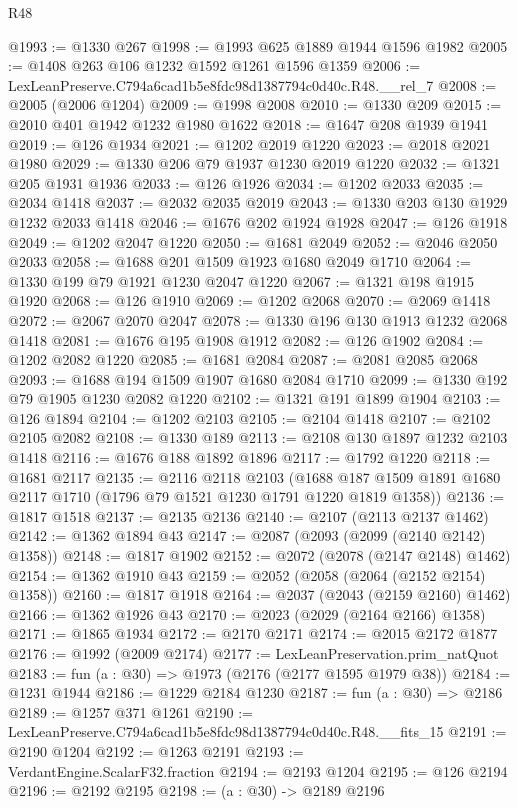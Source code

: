 \begin{lexlean}{R48}
\begin{coremodule}
@1993 := @1330 @267
@1998 := @1993 @625 @1889 @1944 @1596 @1982
@2005 := @1408 @263 @106 @1232 @1592 @1261 @1596 @1359
@2006 := LexLeanPreserve.C794a6cad1b5e8fdc98d1387794c0d40c.R48.__rel_7
@2008 := @2005 (@2006 @1204)
@2009 := @1998 @2008
@2010 := @1330 @209
@2015 := @2010 @401 @1942 @1232 @1980 @1622
@2018 := @1647 @208 @1939 @1941
@2019 := @126 @1934
@2021 := @1202 @2019 @1220
@2023 := @2018 @2021 @1980
@2029 := @1330 @206 @79 @1937 @1230 @2019 @1220
@2032 := @1321 @205 @1931 @1936
@2033 := @126 @1926
@2034 := @1202 @2033
@2035 := @2034 @1418
@2037 := @2032 @2035 @2019
@2043 := @1330 @203 @130 @1929 @1232 @2033 @1418
@2046 := @1676 @202 @1924 @1928
@2047 := @126 @1918
@2049 := @1202 @2047 @1220
@2050 := @1681 @2049
@2052 := @2046 @2050 @2033
@2058 := @1688 @201 @1509 @1923 @1680 @2049 @1710
@2064 := @1330 @199 @79 @1921 @1230 @2047 @1220
@2067 := @1321 @198 @1915 @1920
@2068 := @126 @1910
@2069 := @1202 @2068
@2070 := @2069 @1418
@2072 := @2067 @2070 @2047
@2078 := @1330 @196 @130 @1913 @1232 @2068 @1418
@2081 := @1676 @195 @1908 @1912
@2082 := @126 @1902
@2084 := @1202 @2082 @1220
@2085 := @1681 @2084
@2087 := @2081 @2085 @2068
@2093 := @1688 @194 @1509 @1907 @1680 @2084 @1710
@2099 := @1330 @192 @79 @1905 @1230 @2082 @1220
@2102 := @1321 @191 @1899 @1904
@2103 := @126 @1894
@2104 := @1202 @2103
@2105 := @2104 @1418
@2107 := @2102 @2105 @2082
@2108 := @1330 @189
@2113 := @2108 @130 @1897 @1232 @2103 @1418
@2116 := @1676 @188 @1892 @1896
@2117 := @1792 @1220
@2118 := @1681 @2117
@2135 := @2116
    @2118
    @2103
    (@1688 @187 @1509 @1891 @1680 @2117 @1710 (@1796 @79 @1521 @1230 @1791 @1220 @1819 @1358))
@2136 := @1817 @1518
@2137 := @2135 @2136
@2140 := @2107 (@2113 @2137 @1462)
@2142 := @1362 @1894 @43
@2147 := @2087 (@2093 (@2099 (@2140 @2142) @1358))
@2148 := @1817 @1902
@2152 := @2072 (@2078 (@2147 @2148) @1462)
@2154 := @1362 @1910 @43
@2159 := @2052 (@2058 (@2064 (@2152 @2154) @1358))
@2160 := @1817 @1918
@2164 := @2037 (@2043 (@2159 @2160) @1462)
@2166 := @1362 @1926 @43
@2170 := @2023 (@2029 (@2164 @2166) @1358)
@2171 := @1865 @1934
@2172 := @2170 @2171
@2174 := @2015 @2172 @1877
@2176 := @1992 (@2009 @2174)
@2177 := LexLeanPreservation.prim_natQuot
@2183 := fun (a : @30) => @1973 (@2176 (@2177 @1595 @1979 @38))
@2184 := @1231 @1944
@2186 := @1229 @2184 @1230
@2187 := fun (a : @30) => @2186
@2189 := @1257 @371 @1261
@2190 := LexLeanPreserve.C794a6cad1b5e8fdc98d1387794c0d40c.R48.__fits_15
@2191 := @2190 @1204
@2192 := @1263 @2191
@2193 := VerdantEngine.ScalarF32.fraction
@2194 := @2193 @1204
@2195 := @126 @2194
@2196 := @2192 @2195
@2198 := (a : @30) -> @2189 @2196

\end{coremodule}
\end{lexlean}
